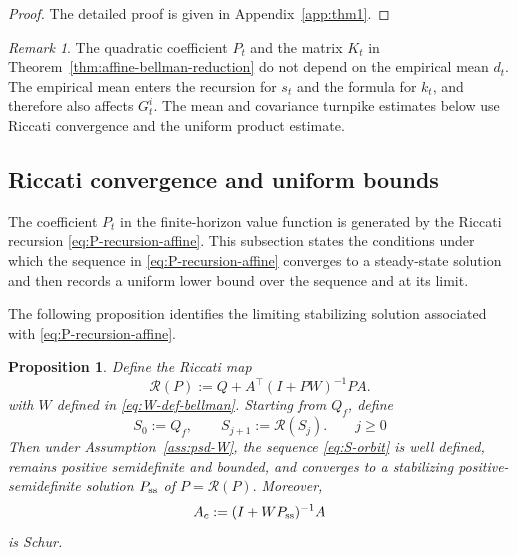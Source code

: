 \documentclass[10pt,journal,twoside]{IEEEtran}
\newtheorem{proposition}{Proposition}
\theoremstyle{definition}
\theoremstyle{remark}
\newtheorem{remark}{Remark}
\begin{document}
\begin{proof}
	The detailed proof is given in
	Appendix~\ref{app:thm1}.
\end{proof}


\begin{remark}
The quadratic coefficient \(P_t\) and the matrix \(K_t\) in Theorem~\ref{thm:affine-bellman-reduction} do not depend on the
empirical mean \(d_t\). The empirical mean enters the recursion for \(s_t\)
and the formula for \(k_t\), and therefore also affects \(G_t^i\). The mean
and covariance turnpike estimates below use Riccati convergence and the
uniform product estimate.
\end{remark}




\subsection{Riccati convergence and uniform bounds}
\label{subsec:riccati-solvability}

The coefficient \(P_t\) in the finite-horizon value function is generated by the Riccati recursion \eqref{eq:P-recursion-affine}. This subsection states the conditions under which the sequence in \eqref{eq:P-recursion-affine} converges to a steady-state solution and then records a uniform lower bound over the sequence and at its limit.





The following proposition identifies the limiting stabilizing  solution associated with  \eqref{eq:P-recursion-affine}.

\begin{proposition}
	\label{prop:riccati-convergence}
	Define the Riccati map
\begin{equation}
	\mathcal R(P):=Q+A^\top(I+PW)^{-1}PA .
	\label{eq:W-R-map}
\end{equation}
with $W$ defined in \eqref{eq:W-def-bellman}. Starting from \(Q_f\), define
\begin{equation}
	S_0:=Q_f,\qquad
	S_{j+1}:=\mathcal R(S_j).\qquad j\ge0
	\label{eq:S-orbit}
\end{equation}
Then under Assumption~\ref{ass:psd-W}, the sequence \eqref{eq:S-orbit} is well defined, remains positive semidefinite and bounded, and converges to a stabilizing positive-semidefinite solution
	\(P_{\rm ss}\) of
	\(
	P=\mathcal R(P).
	\)
	Moreover,
	\begin{equation}
		A_c:=(I+WP_{\rm ss})^{-1}A
		\label{eq:Ac-def}
	\end{equation}
	is Schur.
\end{proposition}
\end{document}
